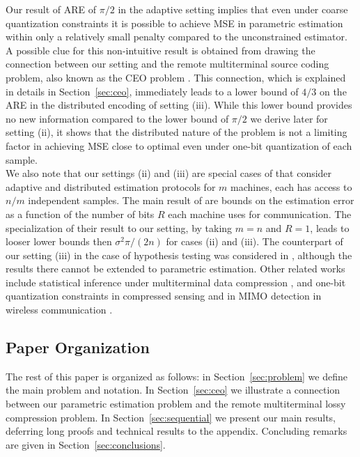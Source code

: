 \documentclass[letterpaper, conference,9pt]{IEEEtran}      %
\begin{document}
Our result of ARE of $\pi/2$ in the adaptive setting implies that even under coarse quantization constraints it is possible to achieve MSE in parametric estimation within only a relatively small penalty compared to the unconstrained estimator. A possible clue for this non-intuitive result is obtained from drawing the connection between our setting and the remote multiterminal source coding problem, also known as the CEO problem \cite{berger1996ceo, viswanathan1997quadratic, oohama1998rate, prabhakaran2004rate}. This connection, which is explained in details in Section~\ref{sec:ceo}, immediately leads to a lower bound of $4/3$ on the ARE in the distributed encoding of setting (iii). While this lower bound provides no new information compared to the lower bound of $\pi /2$ we derive later for setting (ii), it shows that the distributed nature of the problem is not a limiting factor in achieving MSE close to optimal even under one-bit quantization of each sample.\\

We also note that our settings (ii) and (iii) are special cases of 
\cite{zhang2013information} that consider adaptive and distributed estimation protocols for $m$ machines, each has access to $n/m$ independent samples. The main result of \cite{zhang2013information} are bounds on the estimation error as a function of the number of bits $R$ each machine uses for communication. The specialization of their result to our setting, by taking $m=n$ and $R=1$, leads to looser lower bounds then $\sigma^2\pi/(2n)$ for cases (ii) and (iii). The counterpart of our setting (iii) in the case of hypothesis testing was considered in \cite{52470}, although the results there cannot be extended to parametric estimation. Other related works include statistical inference under multiterminal data compression \cite{han1987hypothesis, zhang1988estimation}, and one-bit quantization constraints in compressed sensing  \cite{baraniuk2017exponential} and in MIMO detection in wireless communication \cite{singh2009limits}. \\

\subsection*{Paper Organization}

The rest of this paper is organized as follows: in Section~\ref{sec:problem} we define 
the main problem and notation. In Section~\ref{sec:ceo} we illustrate a connection between our parametric estimation problem and the remote multiterminal lossy compression problem. In Section~\ref{sec:sequential} we present our main results, deferring long proofs and technical results to the appendix. Concluding remarks are given in Section~\ref{sec:conclusions}. 
\end{document}
